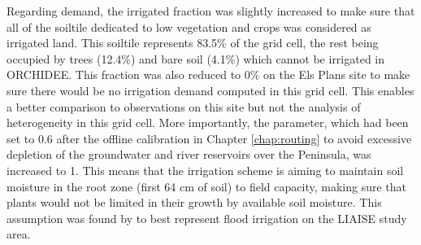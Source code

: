 Regarding demand, the irrigated fraction was slightly increased to make sure that all of the soiltile dedicated to low vegetation and crops was considered as irrigated land. This soiltile represents 83.5\% of the grid cell, the rest being occupied by trees (12.4\%) and bare soil (4.1\%) which cannot be irrigated in ORCHIDEE. This fraction was also reduced to 0\% on the Els Plans site to make sure there would be no irrigation demand computed in this grid cell. This enables a better comparison to observations on this site but not the analysis of heterogeneity in this grid cell.
More importantly, the \betairrig parameter, which had been set to 0.6 after the offline calibration in Chapter \ref{chap:routing} to avoid excessive depletion of the groundwater and river reservoirs over the Peninsula, was increased to 1. This means that the irrigation scheme is aiming to maintain soil moisture in the root zone (first 64 cm of soil) to field capacity, making sure that plants would not be limited in their growth by available soil moisture. This assumption was found by \citet{lunel_interactions_2024} to best represent flood irrigation on the LIAISE study area.

